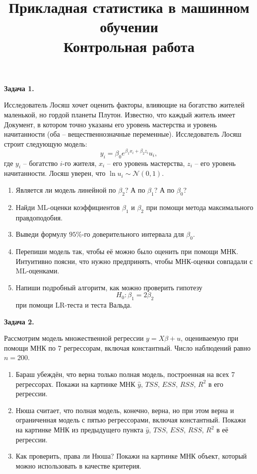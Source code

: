 \documentclass[10pt, a4paper]{extarticle}
\title{{\normalsize Прикладная статистика в машинном обучении} \\ \vspace{0.5em} Контрольная работа}
\author{\rule{15cm}{0.4pt}}
\begin{document}
	
	\maketitle

	{\Large \textbf{Задача 1.}}
	
	Исследователь Лосяш хочет оценить факторы, влияющие на богатство жителей маленькой, но гордой планеты Плутон. Известно, что каждый житель имеет Документ, в котором точно указаны его уровень мастерства и уровень начитанности (оба -- вещественнозначные переменные). Исследователь Лосяш строит следующую модель:
	\[
	y_i = \beta_0e^{\beta_1x_i + \beta_2z_i}u_i,
	\]
	где $y_i$ -- богатство $i$-го жителя, $x_i$ -- его уровень мастерства, $z_i$ -- его уровень начитанности. Лосяш уверен, что $\ln u_i \sim \mathcal{N}(0, 1)$.
	
	\begin{enumerate}[label = \alph*)]
		\item Является ли модель линейной по $\beta_2$? А по $\beta_1$? А по $\beta_0$? 
		\item Найди ML-оценки коэффициентов $\beta_1$ и $\beta_2$ при помощи метода максимального правдоподобия.
		\item Выведи формулу $95\%$-го доверительного интервала для $\beta_0$.
		\item Перепиши модель так, чтобы её можно было оценить при помощи МНК. Интуитивно поясни, что нужно предпринять, чтобы МНК-оценки совпадали с ML-оценками.
		\item Напиши подробный алгоритм, как можно проверить гипотезу
		\[
		H_0: \beta_1 = 2\beta_2
		\]
		при помощи LR-теста и теста Вальда.
	\end{enumerate}
	\vspace{1em}
	
	{\Large \textbf{Задача 2.}}
	
	Рассмотрим модель множественной регрессии $y = X\beta + u$, оцениваемую при помощи МНК по 7 регрессорам, включая константный. Число наблюдений равно $n = 200$. 
	
	\begin{enumerate}[label = \alph*)]
		\item Бараш убеждён, что верна только полная модель, построенная на всех 7 регрессорах. Покажи на картинке МНК $\hat{y}$, $TSS$, $ESS$, $RSS$, $R^2$ в его регрессии.
		\item Нюша считает, что полная модель, конечно, верна, но при этом верна и ограниченная модель с пятью регрессорами, включая константный. Покажи на картинке МНК из предыдущего пункта $\hat{y}$, $TSS$, $ESS$, $RSS$, $R^2$ в её регрессии.
		\item Как проверить, права ли Нюша? Покажи на картинке МНК объект, который можно использовать в качестве критерия. 
	\end{enumerate}
	\vspace{1em}
	
\end{document}
